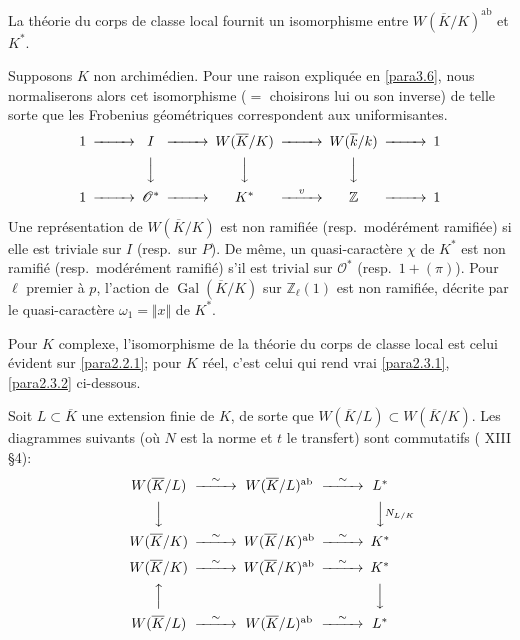 \documentclass[11pt,a4paper]{amsart}
\theoremstyle{plain}
\theoremstyle{definition}
\DeclareMathOperator{\Gal}{Gal}
\newcommand{\dbZ}{\mathbb{Z}}
\newcommand{\ab}{\mathrm{ab}}
\newenvironment{para}{\par\noindent}{\par}
\newcommand{\scrO}{\mathscr{O}}
\newcommand{\ov}[1]{\overline{#1}}
\newcommand{\vl}{\Vert}
\newcommand{\vr}{\Vert}
\begin{document}
\begin{para}
La th\'eorie du corps de classe local fournit un isomorphisme entre $W(\ov{K}/K)^{\ab}$ et $K^{*}$.
\end{para}

Supposons $K$ non archim\'edien. Pour une raison expliqu\'ee en \ref{para3.6}, nous normaliserons alors cet isomorphisme ($=$ choisirons lui ou son inverse) de telle sorte que les Frobenius g\'eom\'etriques correspondent aux uniformisantes.
\[
\begin{CD}
1 @>>> I @>>> W(\ov{K}/K) @>>> W(\ov{k}/k) @>>> 1 \\
@. @VVV @VVV @VVV @. \\
1 @>>> \scrO^{*} @>>> K^{*} @>{v}>> \dbZ @>>> 1
\end{CD}
\]

Une repr\'esentation de $W(\ov{K}/K)$ est non ramifi\'ee (resp.~mod\'er\'ement ramifi\'ee) si elle est triviale sur $I$ (resp.~sur $P$). De m\^eme, un quasi-caract\`ere $\chi$ de $K^{*}$ est non ramifi\'e (resp.~mod\'er\'ement ramifi\'e) s'il est trivial sur $\scrO^{*}$ (resp.~$1+(\pi)$). Pour $\ell$ premier \`a $p$, l'action de $\Gal(\ov{K}/K)$ sur $\dbZ_{\ell}(1)$ est non ramifi\'ee, d\'ecrite par le quasi-caract\`ere $\omega_{1} = \vl x \vr$ de $K^{*}$.

Pour $K$ complexe, l'isomorphisme de la th\'eorie du corps de classe local est celui \'evident sur \ref{para2.2.1}; pour $K$ r\'eel, c'est celui qui rend vrai \ref{para2.3.1}, \ref{para2.3.2} ci-dessous.

\begin{para}
Soit $L \subset \ov{K}$ une extension finie de $K$, de sorte que $W(\ov{K}/L) \subset W(\ov{K}/K)$. Les diagrammes suivants (o\`u $N$ est la norme et $t$ le transfert) sont commutatifs (\cite{10} XIII \S4):
\begin{equation}\label{eq2.3.1}
\begin{CD}
W(\ov{K}/L) @>{\sim}>> W(\ov{K}/L)^{\ab} @>{\sim}>> L^{*} \\
@VVV @. @VV{N_{L/K}}V \\
W(\ov{K}/K) @>{\sim}>> W(\ov{K}/K)^{\ab} @>{\sim}>> K^{*}
\end{CD}
\end{equation}
\begin{equation}\label{eq2.3.2}
\begin{CD}
W(\ov{K}/K) @>{\sim}>> W(\ov{K}/K)^{\ab} @>{\sim}>> K^{*} \\
@AAA @. @VVV \\
W(\ov{K}/L) @>{\sim}>> W(\ov{K}/L)^{\ab} @>{\sim}>> L^{*}
\end{CD}
\end{equation}
\end{para}
\end{document}
